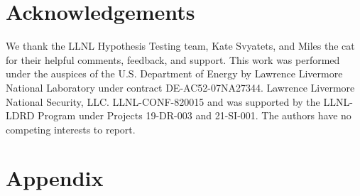 \documentclass{article}
\begin{document}
\section*{Acknowledgements}
We thank the LLNL Hypothesis Testing team, Kate Svyatets, and Miles the cat for their helpful comments, feedback, and support.
This work was performed under the auspices of the U.S. Department of Energy by Lawrence Livermore National Laboratory under contract DE-AC52-07NA27344. Lawrence Livermore National Security, LLC. LLNL-CONF-820015 and was supported by the LLNL-LDRD Program under Projects 19-DR-003 and 21-SI-001.
The authors have no competing interests to report. 



\clearpage
\appendix

\makeatletter
\setlength{\@fptop}{0pt}
\setlength{\@fpbot}{0pt plus 1fil}
\makeatother

\section*{Appendix}
\end{document}
